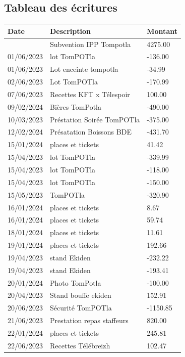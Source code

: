 \documentclass[11pt,a4paper]{article}
\newcommand{\EUR}[1]{#1~\texteuro}
\begin{document}
\subsection*{Tableau des écritures}
\begin{longtable}{L{2.7cm} L{8.2cm} R{3.0cm}}
\toprule
\textbf{Date} & \textbf{Description} & \textbf{Montant} \\
\midrule
 & Subvention IPP Tompotla & \EUR{4275.00} \\
01/06/2023 & lot TomPOTla & \EUR{-136.00} \\
01/06/2023 & Lot enceinte tompotla & \EUR{-34.99} \\
02/06/2023 & Lot TomPOTla & \EUR{-170.99} \\
07/06/2023 & Recettes KFT x Télespoir & \EUR{100.00} \\
09/02/2024 & Bières TomPotla & \EUR{-490.00} \\
10/03/2023 & Préstation Soirée TomPOTla & \EUR{-375.00} \\
12/02/2024 & Présatation Boissons BDE & \EUR{-431.70} \\
15/01/2024 & places et tickets & \EUR{41.42} \\
15/04/2023 & lot TomPOTla & \EUR{-339.99} \\
15/04/2023 & lot TomPOTla & \EUR{-118.00} \\
15/04/2023 & lot TomPOTla & \EUR{-150.00} \\
15/05/2023 & TomPOTla & \EUR{-320.90} \\
16/01/2024 & places et tickets & \EUR{8.67} \\
16/01/2024 & places et tickets & \EUR{59.74} \\
18/01/2024 & places et tickets & \EUR{11.61} \\
19/01/2024 & places et tickets & \EUR{192.66} \\
19/04/2023 & stand Ekiden & \EUR{-232.22} \\
19/04/2023 & stand Ekiden & \EUR{-193.41} \\
20/01/2024 & Photo TomPotla & \EUR{-100.00} \\
20/04/2023 & Stand bouffe ekiden & \EUR{152.91} \\
20/06/2023 & Sécurité TomPOTla & \EUR{-1150.85} \\
21/06/2023 & Prestation repas staffeurs & \EUR{820.00} \\
22/01/2024 & places et tickets & \EUR{245.81} \\
22/06/2023 & Recettes Télébreizh & \EUR{102.47} \\

\end{longtable}
\end{document}
